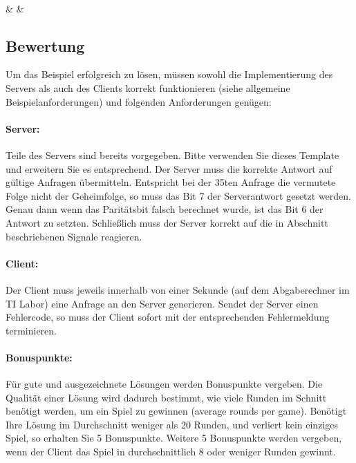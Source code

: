 \begin{bytefield}[boxformatting={\centering\itshape},bitwidth=2.2em]{8}
    \\
    &  & 
\end{bytefield}


\subsection*{Bewertung}
\label{sec:grading}
Um das Beispiel erfolgreich zu lösen, müssen sowohl die Implementierung des
Servers als auch des Clients korrekt funktionieren (siehe allgemeine Beispielanforderungen) und folgenden Anforderungen genügen:

\paragraph{Server:}
Teile des Servers sind bereits vorgegeben. Bitte verwenden Sie dieses Template und erweitern Sie es entsprechend.
Der Server muss die korrekte Antwort auf gültige Anfragen
übermitteln. Entspricht bei der 35ten Anfrage die vermutete Folge nicht der
Geheimfolge, so muss das Bit 7 der Serverantwort gesetzt werden. Genau dann
wenn das Paritätsbit falsch berechnet wurde, ist das Bit 6 der Antwort zu
setzten. Schließlich muss der Server korrekt auf die in Abschnitt
 beschriebenen Signale reagieren.

\paragraph{Client:} Der Client muss jeweils innerhalb von einer Sekunde (auf
dem Abgaberechner im TI Labor) eine Anfrage an den Server generieren. 
Sendet der Server einen Fehlercode, so muss der Client sofort mit der
entsprechenden Fehlermeldung terminieren.

\paragraph{Bonuspunkte:} Für gute und ausgezeichnete L\"osungen werden Bonuspunkte vergeben.
Die Qualität einer Lösung wird dadurch bestimmt, wie viele Runden im Schnitt
benötigt werden, um ein Spiel zu gewinnen (average rounds per game). 
Ben\"otigt Ihre L\"osung im Durchschnitt weniger als 20 Runden, und verliert kein
einziges Spiel, so erhalten Sie 5 Bonuspunkte. Weitere 5 Bonuspunkte werden vergeben,
wenn der Client das Spiel in durchschnittlich 8 oder weniger Runden gewinnt.

\osueguidelinesone



